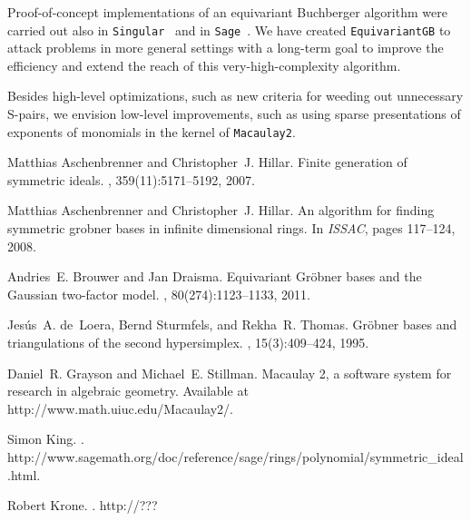 \documentclass[10pt]{amsart}
\theoremstyle{definition}
\theoremstyle{remark}
\numberwithin{equation}{section}
\newcommand{\<}{\langle}
\renewcommand{\>}{\rangle}
\begin{document}
Proof-of-concept implementations of an equivariant Buchberger algorithm were carried out also in {\tt Singular}~\cite{Aschenbrenner-Hillar:ISSAC} and in {\tt Sage}~\cite{SAGE:symmetric-GB}. We have created {\tt EquivariantGB} to attack problems in more general settings with a long-term goal to improve the efficiency and extend the reach of this very-high-complexity algorithm.

Besides high-level optimizations, such as new criteria for weeding out unnecessary S-pairs, we envision low-level improvements, such as using sparse presentations of exponents of monomials in the kernel of {\tt Macaulay2}. 


%

\def\cprime{$'$}
\begin{thebibliography}{1}

Matthias Aschenbrenner and Christopher~J. Hillar.
\newblock Finite generation of symmetric ideals.
, 359(11):5171--5192, 2007.

Matthias Aschenbrenner and Christopher~J. Hillar.
\newblock An algorithm for finding symmetric grobner bases in infinite
  dimensional rings.
\newblock In {\em ISSAC}, pages 117--124, 2008.

Andries~E. Brouwer and Jan Draisma.
\newblock Equivariant {G}r\"obner bases and the {G}aussian two-factor model.
, 80(274):1123--1133, 2011.

Jes{\'u}s~A. de~Loera, Bernd Sturmfels, and Rekha~R. Thomas.
\newblock Gr\"obner bases and triangulations of the second hypersimplex.
, 15(3):409--424, 1995.

Daniel~R. Grayson and Michael~E. Stillman.
\newblock Macaulay 2, a software system for research in algebraic geometry.
\newblock Available at http://www.math.uiuc.edu/Macaulay2/.

Simon King.
.
\newblock
  http://www.sagemath.org/doc/reference/sage/rings/polynomial/symmetric\_ideal%
.html.

Robert Krone.
.
\newblock http://???

\end{thebibliography}
\end{document}

